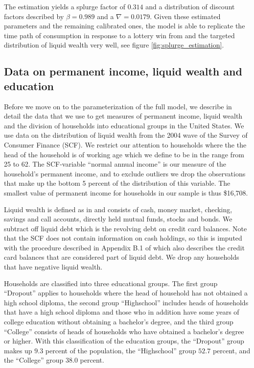\documentclass[../HAFiscal]{subfiles}
\begin{document}
The estimation yields a splurge factor of $0.314$ and a distribution of discount factors described by $\beta = 0.989$ and a $\nabla=0.0179$. Given these estimated parameters and the remaining calibrated ones, the model is able to replicate the time path of consumption in response to a lottery win from \citet{fagereng_mpc_2021} and the targeted distribution of liquid wealth very well, see figure \ref{fig:splurge_estimation}.


\subsection{Data on permanent income, liquid wealth and education}
\label{sec:SCFdata}

Before we move on to the parameterization of the full model, we describe in detail the data that we use to get measures of permanent income, liquid wealth and the division of households into educational groups in the United States. We use data on the distribution of liquid wealth from the 2004 wave of the Survey of Consumer Finance (SCF). We restrict our attention to households where the the head of the household is of working age which we define to be in the range from 25 to 62. The SCF-variable ``normal annual income'' is our measure of the household's permanent income, and to exclude outliers we drop the observations that make up the bottom 5 percent of the distribution of this variable. The smallest value of permanent income for households in our sample is thus \$16,708. 

Liquid wealth is defined as in \cite{kaplan2014model} and consists of cash, money market, checking, savings and call accounts, directly held mutual funds, stocks and bonds. We subtract off liquid debt which is the revolving debt on credit card balances. Note that the SCF does not contain information on cash holdings, so this is imputed with the procedure described in Appendix B.1 of \cite{kaplan2014model} which also describes the credit card balances that are considered part of liquid debt. We drop any households that have negative liquid wealth. 

Households are classified into three educational groups. The first group ``Dropout'' applies to households where the head of household has not obtained a high school diploma, the second group ``Highschool'' includes heads of households that have a high school diploma and those who in addition have some years of college education without obtaining a bachelor's degree, and the third group ``College'' consists of heads of households who have obtained a bachelor's degree or higher. With this classification of the education groups, the ``Dropout'' group makes up $9.3$ percent of the population, the ``Highschool'' group $52.7$ percent, and the ``College'' group $38.0$ percent. 
\end{document}
